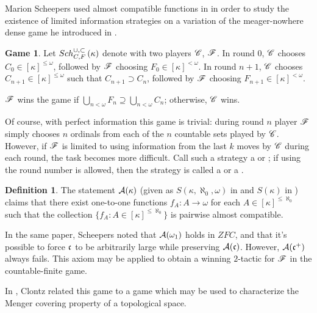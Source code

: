 \documentclass{amsart}
\theoremstyle{plain}
\theoremstyle{definition}
\newtheorem{definition}[theorem]{Definition}
\newtheorem{game}[theorem]{Game}
\theoremstyle{remark}
\theoremstyle{plain}
\theoremstyle{definition}
\theoremstyle{remark}
\begin{document}
  Marion Scheepers used almost compatible functions in \cite{MR1129143} in order
  to study the existence of limited information strategies on a variation
  of the meager-nowhere dense game he introduced in \cite{MR1183703}.

  \begin{game}
    Let \(Sch^{\cup,\subset}_{C,F}\left({\kappa}\right)\) denote
    with two players \(\mathscr{C}\), \(\mathscr{F}\). In round \(0\), \(\mathscr{C}\) chooses
    \(C_0\in[\kappa]^{\leq\omega}\), followed by \(\mathscr{F}\) choosing
    \(F_0\in[\kappa]^{<\omega}\). In round \(n+1\), \(\mathscr{C}\) chooses
    \(C_{n+1}\in[\kappa]^{\leq\omega}\) such that \(C_{n+1}\supset C_n\), followed
    by \(\mathscr{F}\) choosing \(F_{n+1}\in[\kappa]^{<\omega}\).

    \(\mathscr{F}\) wins the game if
    \(\bigcup_{n<\omega} F_n\supseteq\bigcup_{n<\omega} C_n\); otherwise,
    \(\mathscr{C}\) wins.
  \end{game}

  Of course, with perfect information this game is trivial: during round
  \(n\) player \(\mathscr{F}\) simply chooses \(n\) ordinals from each of the
  \(n\) countable sets played by \(\mathscr{C}\). However, if \(\mathscr{F}\) is limited
  to using information from the last \(k\) moves by \(\mathscr{C}\) during each
  round, the task becomes more difficult. Call such a strategy a
   or ; if using the round
  number is allowed, then the strategy is called a 
  or a .

  \begin{definition}
    The statement \(\mathcal{A}(\kappa)\) (given as \(S(\kappa,\aleph_0,\omega)\)
    in \cite{MR1129143} and \(S(\kappa)\) in \cite{clontzMengerGamePreprint})
    claims that there exist one-to-one functions
    \(f_A:A\to\omega\) for each \(A\in[\kappa]^{\leq\aleph_0}\) such that
    the collection \(\{f_A:A\in[\kappa]^{\leq\aleph_0}\}\) is pairwise
    almost compatible.
  \end{definition}

  In the same paper, Scheepers noted that \(\mathcal{A}(\omega_1)\) holds in \(ZFC\),
  and that it's possible to force \(\mathfrak{c}\) to be arbitrarily large
  while preserving \(\mathcal{A}(\mathfrak{c})\). However, \(\mathcal{A}(\mathfrak{c}^+)\) always fails.
  This axiom may be applied to obtain a winning \(2\)-tactic for \(\mathscr{F}\)
  in the countable-finite game.

  In \cite{clontzMengerGamePreprint}, Clontz related this game to a game
  which may be used to characterize the Menger covering property of a
  topological space.
\end{document}
